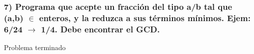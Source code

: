 \subsubsection*{7) Programa que acepte un fracción del tipo a/b tal que (a,b) $\in$ enteros, y la reduzca a sus términos mínimos. Ejem: 6/24 $\rightarrow$ 1/4. Debe encontrar el GCD.}

Problema terminado